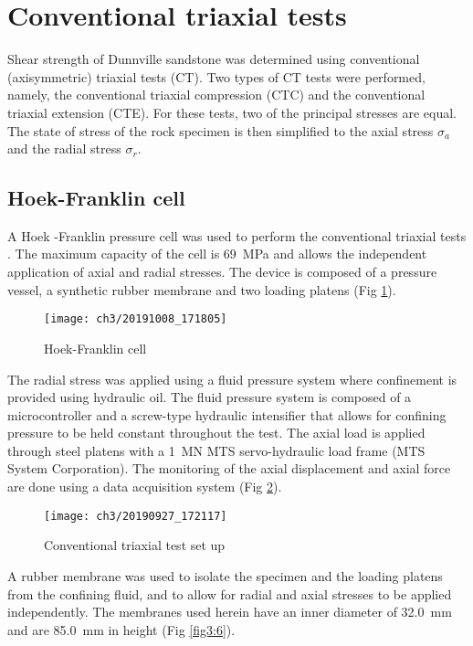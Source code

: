 \section{Conventional triaxial tests}\label{Conventional_Triaxial_tests}

Shear strength of Dunnville sandstone was determined using conventional (axisymmetric) triaxial tests (CT). Two types of CT tests were performed, namely, the conventional triaxial compression (CTC) and the conventional triaxial extension (CTE). For these tests, two of the principal stresses are equal. The state of stress of the rock specimen is then simplified to the axial stress $\sigma_a$ and the radial stress $\sigma_r$. 

\subsection{Hoek-Franklin cell}

A Hoek -Franklin pressure cell was used to perform the conventional triaxial tests \cite{Franklin1970}. The maximum capacity of the cell is \SI{69}{MPa} and allows the independent application of axial and radial stresses. The device is composed of a pressure vessel, a synthetic rubber membrane and two loading platens (Fig \ref{fig3:4}).

\begin{figure}[tb]
    \centering
    \texttt{[image: ch3/20191008\_171805]}
    \caption{Hoek-Franklin cell}
    \label{fig3:4}
\end{figure} 

The radial stress was applied using a fluid pressure system where confinement is provided using hydraulic oil. The fluid pressure system is composed of a microcontroller and a screw-type hydraulic intensifier that allows for confining pressure to be held constant throughout the test. The axial load is applied through steel platens with a \SI{1}{\mega\newton} MTS servo-hydraulic load frame (MTS System Corporation). The monitoring of the axial displacement and axial force are done using a data acquisition system (Fig \ref{fig3:5}).

\begin{figure}[tb]
    \centering
    \texttt{[image: ch3/20190927\_172117]}
    \caption{Conventional triaxial test set up}
    \label{fig3:5}
\end{figure} 

A rubber membrane was used to isolate the specimen and the loading platens from the confining fluid, and to allow for radial and axial stresses to be applied independently. The membranes used herein have an inner diameter of \SI{32.0}{mm} and are \SI{85.0}{mm} in height (Fig \ref{fig3:6}).

